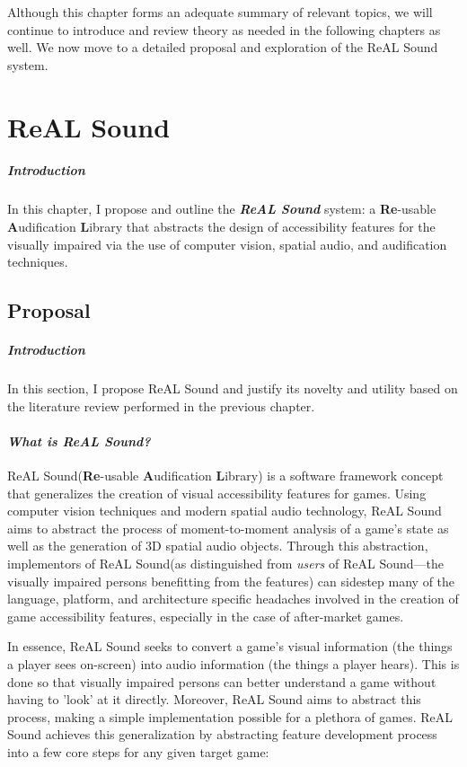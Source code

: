 \documentclass{report}
\newcommand{\rs}{ReAL Sound\xspace}
\newcommand{\rsfull}{\textbf{Re}-usable \textbf{A}udification \textbf{L}ibrary\xspace}
\begin{document}
Although this chapter forms an adequate summary of relevant topics, we will continue to introduce and review theory as needed in the following chapters as well. We now move to a detailed proposal and exploration of the \rs system.



\chapter{ReAL Sound}
\paragraph{Introduction}
In this chapter, I propose and outline the \textbf{\emph{\rs}} system: a \rsfull that abstracts the design of accessibility features for the visually impaired via the use of computer vision, spatial audio, and audification techniques.

\section{Proposal} 
\paragraph{Introduction} 

In this section, I propose \rs and justify its novelty and utility based on the literature review performed in the previous chapter.

\subsubsection{\emph{What is \rs?}}
\rs (\rsfull) is a software framework concept that generalizes the creation of visual accessibility features for games. Using computer vision techniques and modern spatial audio technology, \rs aims to abstract the process of moment-to-moment analysis of a game's state as well as the generation of 3D spatial audio objects. Through this abstraction, implementors of \rs (as distinguished from \emph{users} of \rs---the visually impaired persons benefitting from the features) can sidestep many of the language, platform, and architecture specific headaches involved in the creation of game accessibility features, especially in the case of after-market games. 

In essence, \rs seeks to convert a game's visual information (the things a player sees on-screen) into audio information (the things a player hears). This is done so that visually impaired persons can better understand a game without having to 'look' at it directly. Moreover, \rs aims to abstract this process, making a simple implementation possible for a plethora of games. \rs achieves this generalization by abstracting feature development process into a few core steps for any given target game:
\end{document}
